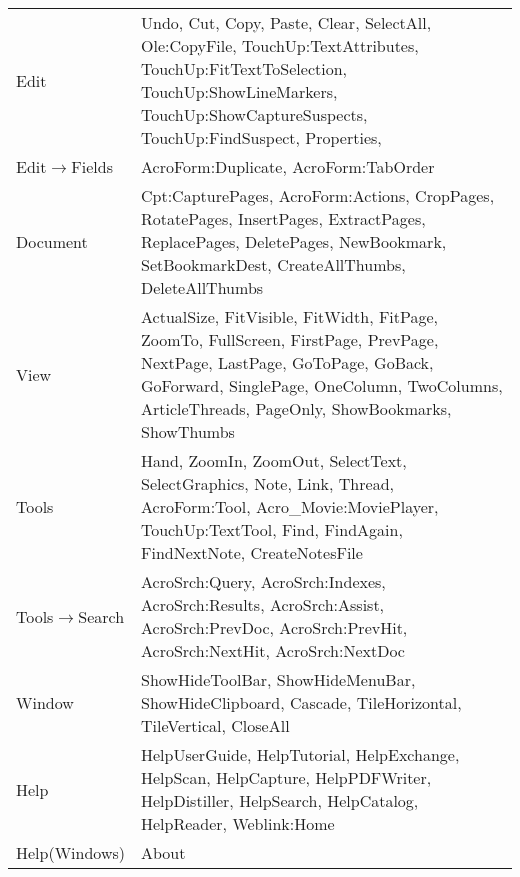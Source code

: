 {\begin{center}
\begin{xtabular}{|p{4cm}|p{10cm}|}
Edit                          & Undo, Cut, Copy, Paste, Clear, SelectAll, Ole:CopyFile,  TouchUp:TextAttributes,  TouchUp:FitTextToSelection,  TouchUp:ShowLineMarkers,  TouchUp:ShowCaptureSuspects,  TouchUp:FindSuspect,  Properties,                                                           \\
Edit$\rightarrow$Fields       & AcroForm:Duplicate, AcroForm:TabOrder                                                                                                                                                                                                                              \\
Document                      & Cpt:CapturePages, AcroForm:Actions, CropPages, RotatePages, InsertPages, ExtractPages,    ReplacePages, DeletePages, NewBookmark, SetBookmarkDest, CreateAllThumbs, DeleteAllThumbs                                                                                \\
View                          & ActualSize, FitVisible, FitWidth, FitPage, ZoomTo, FullScreen,              FirstPage, PrevPage, NextPage, LastPage, GoToPage, GoBack,              GoForward, SinglePage, OneColumn, TwoColumns,              ArticleThreads, PageOnly, ShowBookmarks, ShowThumbs \\
Tools                         & Hand, ZoomIn, ZoomOut, SelectText, SelectGraphics, Note, Link, Thread,  AcroForm:Tool, Acro\_Movie:MoviePlayer, TouchUp:TextTool, Find, FindAgain,  FindNextNote, CreateNotesFile                                                                                  \\
Tools$\rightarrow$Search      & AcroSrch:Query,  AcroSrch:Indexes,  AcroSrch:Results,  AcroSrch:Assist,  AcroSrch:PrevDoc,  AcroSrch:PrevHit,  AcroSrch:NextHit,  AcroSrch:NextDoc                                                                                                                 \\
Window                        & ShowHideToolBar, ShowHideMenuBar, ShowHideClipboard,    Cascade,    TileHorizontal,    TileVertical,    CloseAll                                                                                                                                                   \\
Help                          & HelpUserGuide, HelpTutorial, HelpExchange, HelpScan,                    HelpCapture, HelpPDFWriter, HelpDistiller, HelpSearch,                    HelpCatalog, HelpReader, Weblink:Home                                                                            \\
Help(Windows)                 & About                                                                                                                                                                                                                                                              \\
\bottomrule
\end{xtabular}
\end{center}
} 

